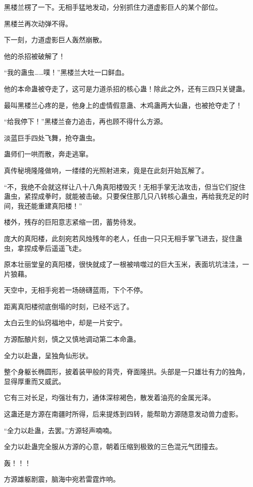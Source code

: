 \begin{this_body}
黑楼兰楞了一下。无相手猛地发动，分别抓住力道虚影巨人的某个部位。

黑楼兰再次动弹不得。

下一刻，力道虚影巨人轰然崩散。

他的杀招被破解了！

“我的蛊虫……噗！”黑楼兰大吐一口鲜血。

他的本命蛊被夺走了，这可是力道杀招的核心蛊！除此之外，还有三四只关键蛊。

最叫黑楼兰心疼的是，他身上的虚情假意蛊、木鸡蛊两大仙蛊，也被抢夺走了！

“给我停下！”黑楼兰奋力追击，再也顾不得什么方源。

淡蓝巨手四处飞舞，抢夺蛊虫。

蛊师们一哄而散，奔走逃窜。

真传秘境隆隆做响，一缕缕的光照射进来，竟是在此刻开始瓦解了。

“不，我绝不会就这样让八十八角真阳楼毁灭！无相手掌无法攻击，但当它们捉住蛊虫，紧捏成拳时，就能被击破。只要保住那几只八转核心蛊虫，再给我充足的时间，我还能重建真阳楼！”

楼外，残存的巨阳意志紧缩一团，蓄势待发。

庞大的真阳楼，此刻宛若风烛残年的老人，任由一只只无相手掌飞进去，捉住蛊虫，拿捏成拳后遥遥飞走。

原本壮丽堂皇的真阳楼，很快就成了一根被啃噬过的巨大玉米，表面坑坑洼洼，一片狼藉。

天空中，无相手宛若一场磅礴蓝雨，下个不停。

距离真阳楼彻底倒塌的时刻，已经不远了。

太白云生的仙窍福地中，却是一片安宁。

方源酝酿片刻，慎之又慎地调动第二本命蛊。

全力以赴蛊，呈独角仙形状。

整个身躯长椭圆形，披着装甲般的背壳，脊面隆拱。头部是一只雄壮有力的独角，显得厚重而又威武。

它有三对长足，均强壮有力，通体深棕褐色，散发着油亮的金属光泽。

这蛊还是方源在南疆时所得，后来提炼到四转，能帮助方源随意发动兽力虚影。

“全力以赴蛊，去罢。”方源轻声喃喃。

全力以赴蛊完全服从方源的心意，朝着压缩到极致的三色混元气团撞去。

轰！！！

方源雄躯剧震，脑海中宛若雷霆炸响。


\end{this_body}

